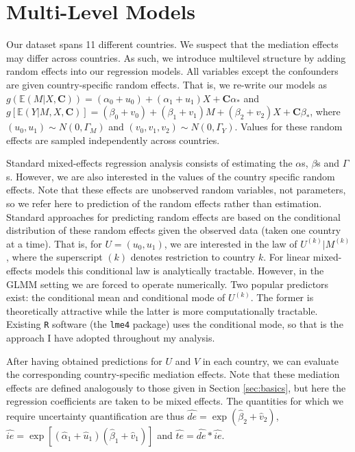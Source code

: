 \documentclass{article}
\newcommand{\bE}{\mathbb{E}}
\newcommand{\C}{\mathbf{C}}
\begin{document}

\section{Multi-Level Models}
\label{sec:multi_level}

Our dataset spans 11 different countries. We suspect that the mediation effects may differ across countries. As such, we introduce multilevel structure by adding random effects into our regression models. All variables except the confounders are given country-specific random effects. That is, we re-write our models as $g(\bE(M | X, \C)) = (\alpha_0 + u_0) + (\alpha_1 + u_1) X + \C \alpha_*$ and $g[\bE(Y | M, X, \C)] = (\beta_0 + v_0) + (\beta_1 + v_1) M + (\beta_2 + v_2) X + \C \beta_*$, where $(u_0, u_1) \sim N(0, \Gamma_M)$ and $(v_0, v_1, v_2) \sim N(0, \Gamma_Y)$. Values for these random effects are sampled independently across countries.

Standard mixed-effects regression analysis consists of estimating the $\alpha$s, $\beta$s and $\Gamma$s. However, we are also interested in the values of the country specific random effects. Note that these effects are unobserved random variables, not parameters, so we refer here to prediction of the random effects rather than estimation. Standard approaches for predicting random effects are based on the conditional distribution of these random effects given the observed data (taken one country at a time). That is, for $U = (u_0, u_1)$, we are interested in the law of $U^{(k)} | M^{(k)}$, where the superscript $(k)$ denotes restriction to country $k$. For linear mixed-effects models this conditional law is analytically tractable. However, in the GLMM setting we are forced to operate numerically. Two popular predictors exist: the conditional mean and conditional mode of $U^{(k)}$. The former is theoretically attractive while the latter is more computationally tractable. Existing \texttt{R} software (the \texttt{lme4} package) uses the conditional mode, so that is the approach I have adopted throughout my analysis.

After having obtained predictions for $U$ and $V$ in each country, we can evaluate the corresponding country-specific mediation effects. Note that these mediation effects are defined analogously to those given in Section \ref{sec:basics}, but here the regression coefficients are taken to be mixed effects. The quantities for which we require uncertainty quantification are thus $\hat{de} = \exp(\hat{\beta}_2 + \hat{v}_2)$, $\hat{ie} = \exp [(\hat{\alpha}_1 + \hat{u}_1) (\hat{\beta}_1 + \hat{v}_1)]$ and $\hat{te} = \hat{de} * \hat{ie}$.
\end{document}
